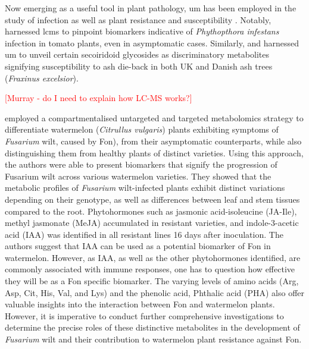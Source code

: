 Now emerging as a useful tool in plant pathology, \ac{um} has been employed in the study of infection as well as plant resistance and susceptibility \parencite{Allwood2021}. Notably, \textcite{Garcia2018} harnessed \ac{lcms} to pinpoint biomarkers indicative of \textit{Phythopthora infestans} infection in tomato plants, even in asymptomatic cases. Similarly, \textcite{Sambles2017} and \textcite{Sidda2020} harnessed \ac{um} to unveil certain secoiridoid glycosides as discriminatory metabolites signifying susceptibility to ash die-back in both UK and Danish ash trees (\textit{Fraxinus excelsior}).


\textcolor{red}{[Murray - do I need to explain how LC-MS works?]}

\textcite{Kasote2020} employed a compartmentalised untargeted and targeted metabolomics strategy to differentiate watermelon (\textit{Citrullus vulgaris}) plants exhibiting symptoms of \textit{Fusarium} wilt, caused by \ac{Fon}), from their asymptomatic counterparts, while also distinguishing them from healthy plants of distinct varieties. Using this approach, the authors were able to present biomarkers that signify the progression of Fusarium wilt across various watermelon varieties. They showed that the metabolic profiles of \textit{Fusarium} wilt-infected plants exhibit distinct variations depending on their genotype, as well as differences between leaf and stem tissues compared to the root. Phytohormones such as jasmonic acid-isoleucine (JA-Ile), methyl jasmonate (MeJA) accumulated in resistant varieties, and indole-3-acetic acid (IAA) was identified in all resistant lines 16 days after inoculation. The authors suggest that IAA can be used as a potential biomarker of \ac{Fon} in watermelon. However, as IAA, as well as the other phytohormones identified,  are commonly associated with immune responses, one has to question how effective they will be as a \ac{Fon} specific biomarker. The varying levels of amino acids (Arg, Asp, Cit, His, Val, and Lys) and the phenolic acid, Phthalic acid (PHA) also offer valuable insights into the interaction between \ac{Fon} and watermelon plants. However, it is imperative to conduct further comprehensive investigations to determine the precise roles of these distinctive metabolites in the development of \textit{Fusarium} wilt and their contribution to watermelon plant resistance against \ac{Fon}.

